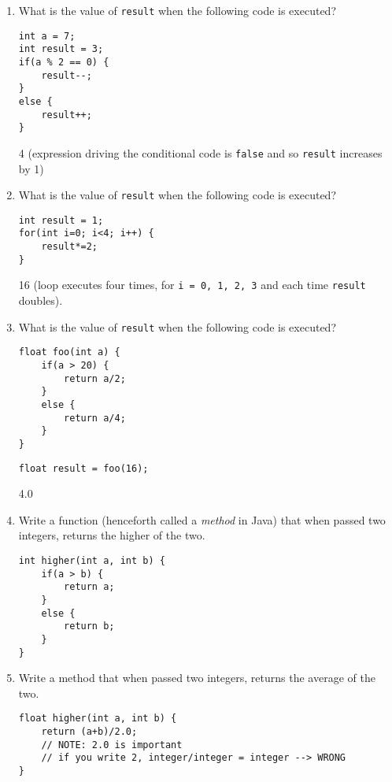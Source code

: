 \begin{questions}
\begin{enumerate}
\item What is the value of \texttt{result} when the following code is executed?
\begin{lstlisting}
int a = 7;
int result = 3;
if(a % 2 == 0) {
	result--;
}
else {
	result++;
}
\end{lstlisting}

\begin{solution}
4 (expression driving the conditional code is \texttt{false} and so \texttt{result} increases by 1)
\end{solution}

\item What is the value of \texttt{result} when the following code is executed?
\begin{lstlisting}
int result = 1;
for(int i=0; i<4; i++) {
	result*=2;
}
\end{lstlisting}

\begin{solution}
16 (loop executes four times, for \texttt{i = 0, 1, 2, 3} and each time \texttt{result} doubles).
\end{solution}

\item What is the value of \texttt{result} when the following code is executed?
\begin{lstlisting}
float foo(int a) {
	if(a > 20) {
		return a/2;
	}
	else {
		return a/4;
	}
}
\end{lstlisting}

\begin{lstlisting}
float result = foo(16);
\end{lstlisting}

\begin{solution}
4.0
\end{solution}

\item Write a function (henceforth called a \emph{method} in Java) that when passed two integers, returns the higher of the two.
\begin{solution}
\begin{lstlisting}
int higher(int a, int b) {
	if(a > b) {
		return a;
	}
	else {
		return b;
	}
}
\end{lstlisting}
\end{solution}

\item Write a method that when passed two integers, returns the average of the two.
\begin{solution}
\begin{lstlisting}
float higher(int a, int b) {
	return (a+b)/2.0; 
	// NOTE: 2.0 is important
	// if you write 2, integer/integer = integer --> WRONG
}
\end{lstlisting}
\end{solution}


\end{enumerate}
\end{questions}
